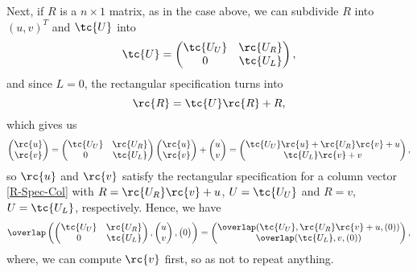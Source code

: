 Next, if $R$ is a $n \times 1$ matrix, as in the case above, we can subdivide $R$ into $(u , v)^T$ and $\tc{U}$ into 
\begin{equation*}
  \tc{U} = 
  \begin{pmatrix}
    \tc{U_U} & \rc{U_R} \\
    0   & \tc{U_L}
  \end{pmatrix},
\end{equation*}
and since $L = 0$, the rectangular specification turns into 
\begin{equation}
\label{R-Spec-Col}
\rc{R} = \tc{U}\rc{R} + R,
\end{equation}
which gives us
\begin{equation*}
  \begin{pmatrix}
    \rc{u} \\
    \rc{v}
  \end{pmatrix}
  = \begin{pmatrix}
    \tc{U_U} & \rc{U_R} \\
    0        & \tc{U_L}
  \end{pmatrix}
  \begin{pmatrix}
    \rc{u} \\
    \rc{v}
  \end{pmatrix} 
  + 
  \begin{pmatrix}
    u \\
    v
  \end{pmatrix}
  = 
  \begin{pmatrix}
    \tc{U_U}\rc{u} + \rc{U_R}\rc{v} + u \\
    \tc{U_L}\rc{v} + v
  \end{pmatrix},
\end{equation*}
so $\rc{u}$ and $\rc{v}$ satisfy the rectangular specification for a column vector \eqref{R-Spec-Col} with $R = \rc{U_R}\rc{v} + u$, $U = \tc{U_U}$ and $R = v$, $U = \tc{U_L}$, respectively. Hence, we have 
\begin{equation}
\label{overlap3}
\overlap\left(
\begin{pmatrix}
  \tc{U_U} & \rc{U_R} \\
    0      & \tc{U_L}
\end{pmatrix}
, 
\begin{pmatrix}
  u \\ 
  v
\end{pmatrix}
, 
\begin{pmatrix}
0
\end{pmatrix}
\right) = 
\begin{pmatrix}
  \overlap(\tc{U_U} , \rc{U_R}\rc{v} + u , (0) ) \\ 
  \overlap(\tc{U_L} , v, (0) ) 
\end{pmatrix},
\end{equation}
where, we can compute $\rc{v}$ first, so as not to repeat anything.

